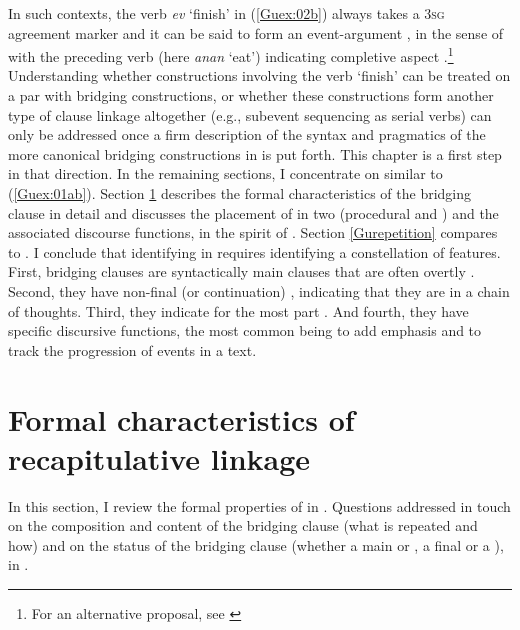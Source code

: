 \documentclass[output=paper]{LSP/langsci}
\begin{document}
In such contexts, the verb \textit{ev} `finish' in (\ref{Guex:02b}) always takes a \textsc{3sg} agreement marker and it can be said to form an event-argument , in the sense of \citet[][18]{aikhenvald2006serial}  with the preceding verb (here \textit{anan} `eat') indicating completive aspect \citep[][225, 267]{guerin11}.\footnote{For an alternative proposal, see \citet[][131, 241]{cleary15}} Understanding whether constructions involving the verb `finish' can be treated on a par with bridging constructions, or whether these constructions form another type of clause linkage altogether (e.g., subevent sequencing as serial verbs) can only be addressed once a firm description of the syntax and pragmatics of the more canonical bridging constructions in  is put forth. This chapter is a first step in that direction. In the remaining sections, I concentrate on  similar to (\ref{Guex:01ab}).  Section \ref{Gusec:recapitulative} describes the formal characteristics of the bridging clause in detail and  discusses the placement of  in two  (procedural and ) and the associated discourse functions, in the spirit of \citet{devries.2005}. Section \ref{Gurepetition} compares  to . I conclude that identifying  in  requires identifying a constellation of features. First, bridging clauses are syntactically main clauses that are often overtly . Second, they have non-final (or continuation) , indicating that they are in a chain of thoughts. Third, they indicate for the most part . And fourth, they have specific discursive functions, the most common being to add emphasis and to track the progression of events in a text.


\section{Formal characteristics of recapitulative linkage} 
\label{Gusec:recapitulative}
In this section, I review the formal properties of  in . Questions addressed in  touch on the composition and content of the bridging clause (what is repeated and how) and on the status of the bridging clause (whether a main or , a final or a ), in .
\end{document}
